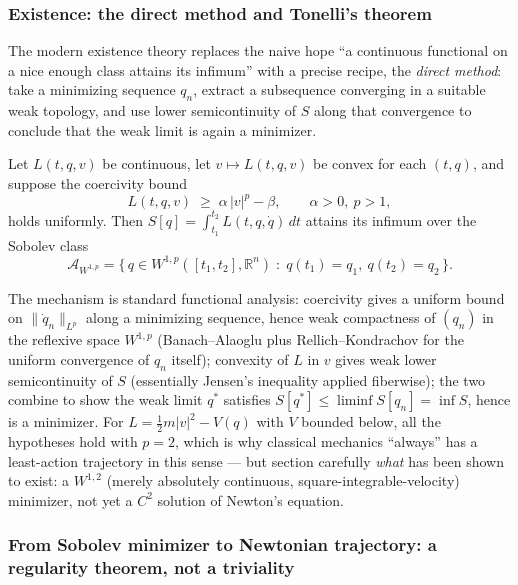 \subsubsection{Existence: the direct method and Tonelli's theorem}

The modern existence theory replaces the naive hope ``a continuous functional
on a nice enough class attains its infimum'' with a precise recipe, the
\emph{direct method}: take a minimizing sequence $q_n$, extract a subsequence
converging in a suitable weak topology, and use lower semicontinuity of $S$
along that convergence to conclude that the weak limit is again a minimizer.

\begin{theorem}
\label{thm:tonelli}
Let $L(t,q,v)$ be continuous, let $v\mapsto L(t,q,v)$ be convex for each
    $(t,q)$, and suppose the coercivity bound
\[
L(t,q,v) \;\ge\; \alpha\,|v|^p - \beta, \qquad \alpha>0,\ p>1,
\]
holds uniformly. Then $S[q]=\int_{t_1}^{t_2}L(t,q,\dot q)\,dt$ attains its
    infimum over the Sobolev class
\[
\mathcal{A}_{W^{1,p}} = \bigl\{\, q\in W^{1,p}([t_1,t_2],\mathbb{R}^n) 
    \;:\; q(t_1)=q_1,\ q(t_2)=q_2 \,\bigr\}.
\]
\end{theorem}

The mechanism is standard functional analysis: coercivity gives a uniform bound
on $\|\dot q_n\|_{L^p}$ along a minimizing sequence, hence weak compactness of
$(q_n)$ in the reflexive space $W^{1,p}$ (Banach--Alaoglu plus
Rellich--Kondrachov for the uniform convergence of $q_n$ itself); convexity of
$L$ in $v$ gives weak lower semicontinuity of $S$ (essentially Jensen's
inequality applied fiberwise); the two combine to show the weak limit $q^\ast$
satisfies $S[q^\ast]\le \liminf S[q_n] = \inf S$, hence is a minimizer. For
$L=\tfrac12 m|v|^2 - V(q)$ with $V$ bounded below, all the hypotheses hold with
$p=2$, which is why classical mechanics ``always'' has a least-action
trajectory in this sense --- but section carefully \emph{what} has been shown to
exist: a $W^{1,2}$ (merely absolutely continuous, square-integrable-velocity)
minimizer, not yet a $C^2$ solution of Newton's equation.

\subsubsection{From Sobolev minimizer to Newtonian trajectory: a regularity theorem, not a triviality}

